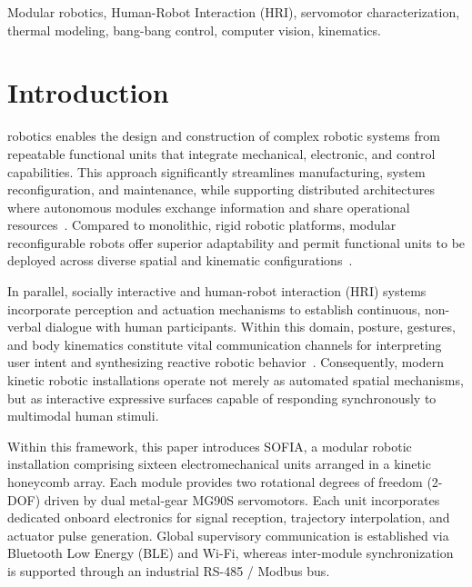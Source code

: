 \documentclass[lettersize,journal]{IEEEtran}
\begin{document}
\begin{IEEEkeywords}
Modular robotics, Human-Robot Interaction (HRI), servomotor characterization, thermal modeling, bang-bang control, computer vision, kinematics.
\end{IEEEkeywords}

\section{Introduction}
\label{sec:introduction}

 robotics enables the design and construction of complex robotic systems from repeatable functional units that integrate mechanical, electronic, and control capabilities. This approach significantly streamlines manufacturing, system reconfiguration, and maintenance, while supporting distributed architectures where autonomous modules exchange information and share operational resources~\cite{seo2019modular}. Compared to monolithic, rigid robotic platforms, modular reconfigurable robots offer superior adaptability and permit functional units to be deployed across diverse spatial and kinematic configurations~\cite{seo2019modular}.

In parallel, socially interactive and human-robot interaction (HRI) systems incorporate perception and actuation mechanisms to establish continuous, non-verbal dialogue with human participants. Within this domain, posture, gestures, and body kinematics constitute vital communication channels for interpreting user intent and synthesizing reactive robotic behavior~\cite{fong2003social}. Consequently, modern kinetic robotic installations operate not merely as automated spatial mechanisms, but as interactive expressive surfaces capable of responding synchronously to multimodal human stimuli.

Within this framework, this paper introduces SOFIA, a modular robotic installation comprising sixteen electromechanical units arranged in a kinetic honeycomb array. Each module provides two rotational degrees of freedom (2-DOF) driven by dual metal-gear MG90S servomotors. Each unit incorporates dedicated onboard electronics for signal reception, trajectory interpolation, and actuator pulse generation. Global supervisory communication is established via Bluetooth Low Energy (BLE) and Wi-Fi, whereas inter-module synchronization is supported through an industrial RS-485 / Modbus bus.
\end{document}
